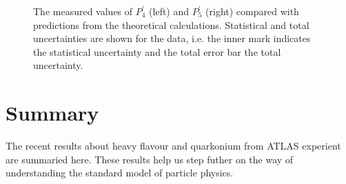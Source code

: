\documentclass[epj]{webofc}
\begin{document}
\begin{figure}
\begin{subfigure}[H]{0.45\textwidth}
    \end{subfigure}
    \caption{The measured values of $P_4^{\prime}$ (left) and $P_5^{\prime}$ (right) compared with predictions from the theoretical calculations. Statistical and total uncertainties are shown for the data, i.e. the inner mark indicates the statistical uncertainty and the total error bar the total uncertainty.} 
    \label{fig:bkmumu}
\end{figure}

\section{Summary}

The recent results about heavy flavour and quarkonium from ATLAS experient are summaried here.
These results help us step futher on the way of understanding the standard model of particle
physics. 
\\
\end{document}
